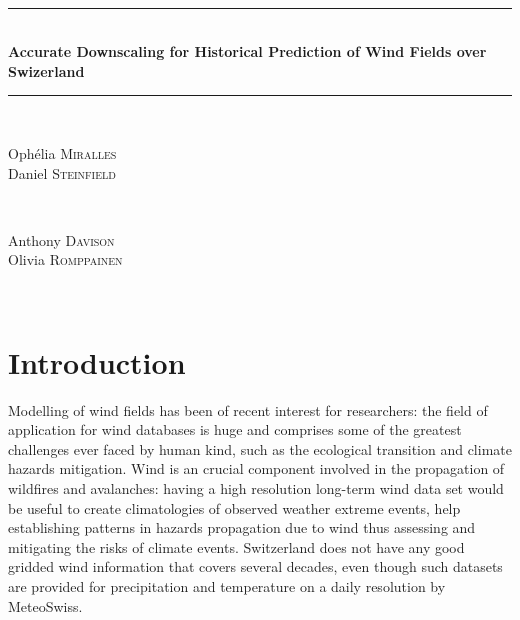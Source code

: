 \documentclass[11pt,a4paper]{amsart}
\date{}
\theoremstyle{plain}
\theoremstyle{definition}
\theoremstyle{remark}
\theoremstyle{remark}
\theoremstyle{definition}
\newcommand{\1}{\mathbbm{1}}
\begin{document}
    \onehalfspacing
\newcommand{\HRule}{\rule{\linewidth}{0.5mm}}


\begin{titlepage}
  
\centering
\textsc{\large }\\[0,3cm]



\HRule \\[0.4cm]
{ \huge \bfseries Accurate Downscaling for Historical Prediction of Wind Fields over Swizerland}\\[0.4cm] 
\HRule \\[1.5cm]


\begin{minipage}{0.5\textwidth}
    \begin{flushleft} \large
        Ophélia \textsc{Miralles}\\
         Daniel \textsc{Steinfield}
    \end{flushleft}
\end{minipage}
~
\begin{minipage}{0.4\textwidth}
    \begin{flushright} \large
        Anthony \textsc{Davison} \\
        Olivia \textsc{Romppainen}
    \end{flushright}
\end{minipage}\\[2cm]




\end{titlepage}

\tableofcontents
  
  \section*{Introduction}
     Modelling of wind fields has been of recent interest for researchers: the field of application for wind databases is huge and comprises some of the greatest challenges ever faced by human kind, such as the ecological transition and climate hazards mitigation. Wind is an crucial component involved in the propagation of wildfires and avalanches: having a high resolution long-term wind data set would be useful to create climatologies of observed weather extreme events, help establishing patterns in hazards propagation due to wind thus assessing and mitigating the risks of climate events. Switzerland does not have any good gridded wind information that covers several decades, even though such datasets are provided for precipitation and temperature on a daily resolution by MeteoSwiss.
     
\end{document}
